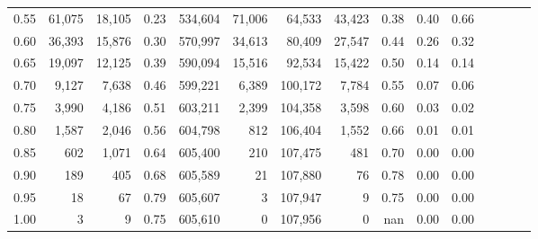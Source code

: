 \begin{tabular}{rrrcrrrrrrrrrrr}
0.55 &   61,075 &  18,105 &                                       0.23 &  534,604 &   71,006 &   64,533 &   43,423 &  0.38 &  0.40 &                         0.66 \\
0.60 &   36,393 &  15,876 &                                       0.30 &  570,997 &   34,613 &   80,409 &   27,547 &  0.44 &  0.26 &                         0.32 \\
0.65 &   19,097 &  12,125 &                                       0.39 &  590,094 &   15,516 &   92,534 &   15,422 &  0.50 &  0.14 &                         0.14 \\
0.70 &    9,127 &   7,638 &                                       0.46 &  599,221 &    6,389 &  100,172 &    7,784 &  0.55 &  0.07 &                         0.06 \\
0.75 &    3,990 &   4,186 &                                       0.51 &  603,211 &    2,399 &  104,358 &    3,598 &  0.60 &  0.03 &                         0.02 \\
0.80 &    1,587 &   2,046 &                                       0.56 &  604,798 &      812 &  106,404 &    1,552 &  0.66 &  0.01 &                         0.01 \\
0.85 &      602 &   1,071 &                                       0.64 &  605,400 &      210 &  107,475 &      481 &  0.70 &  0.00 &                         0.00 \\
0.90 &      189 &     405 &                                       0.68 &  605,589 &       21 &  107,880 &       76 &  0.78 &  0.00 &                         0.00 \\
0.95 &       18 &      67 &                                       0.79 &  605,607 &        3 &  107,947 &        9 &  0.75 &  0.00 &                         0.00 \\
1.00 &        3 &       9 &                                       0.75 &  605,610 &        0 &  107,956 &        0 &   nan &  0.00 &                         0.00 \\
\bottomrule
\end{tabular}
